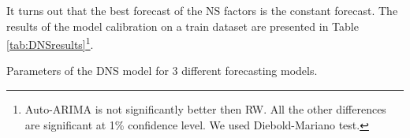             It turns out that the best forecast of the NS factors is the constant forecast. The results of the model calibration on a train dataset are presented 
            in Table \ref{tab:DNSresults}\footnote{Auto-ARIMA is not significantly better then RW. 
            All the other differences are significant at 1\% confidence level. We used Diebold-Mariano test. }.
            \begin{table}[htbp]
                \centering
                
                \caption{Parameters of the DNS model for 3 different forecasting models.}
                \label{tab:DNSresults}
            \end{table}
